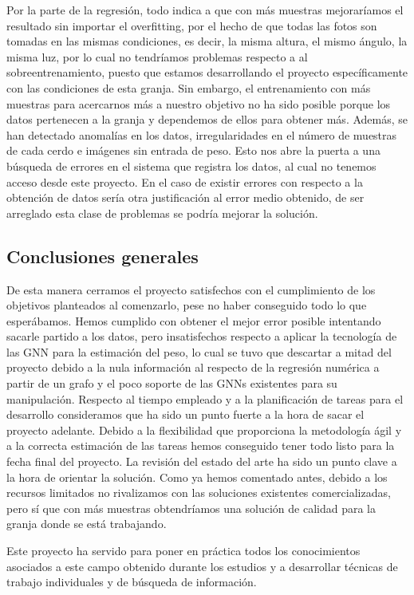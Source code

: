 ﻿\documentclass[10pt,a4paper,twocolumn,twoside]{article}
\begin{document}
Por la parte de la regresión, todo indica a que con más muestras mejoraríamos el resultado sin importar el overfitting, por el hecho de que todas las fotos son tomadas en las mismas condiciones, es decir, la misma altura, el mismo ángulo, la misma luz, por lo cual no tendríamos problemas respecto a al sobreentrenamiento, puesto que estamos desarrollando el proyecto específicamente con las condiciones de esta granja. Sin embargo, el entrenamiento con más muestras para acercarnos más a nuestro objetivo no ha sido posible porque los datos pertenecen a la granja y dependemos de ellos para obtener más.
Además, se han detectado anomalías en los datos, irregularidades en el número de muestras de cada cerdo e imágenes sin entrada de peso. Esto nos abre la puerta a una búsqueda de errores en el sistema que registra los datos, al cual no tenemos acceso desde este proyecto. En el caso de existir errores con respecto a la obtención de datos sería otra justificación al error medio obtenido, de ser arreglado esta clase de problemas se podría mejorar la solución.

\subsection{Conclusiones generales}
De esta manera cerramos el proyecto satisfechos con el cumplimiento de los objetivos planteados al comenzarlo, pese no haber conseguido todo lo que esperábamos. Hemos cumplido con obtener el mejor error posible intentando sacarle partido a los datos, pero insatisfechos respecto a aplicar la tecnología de las GNN para la estimación del peso, lo cual se tuvo que descartar a mitad del proyecto debido a la nula información al respecto de la regresión numérica a partir de un grafo y el poco soporte de las GNNs existentes para su manipulación.
Respecto al tiempo empleado y a la planificación de tareas para el desarrollo consideramos que ha sido un punto fuerte a la hora de sacar el proyecto adelante. Debido a la flexibilidad que proporciona la metodología ágil y a la correcta estimación de las tareas hemos conseguido tener todo listo para la fecha final del proyecto.
La revisión del estado del arte ha sido un punto clave a la hora de orientar la solución. Como ya hemos comentado antes, debido a los recursos limitados no rivalizamos con las soluciones existentes comercializadas, pero sí que con más muestras obtendríamos una solución de calidad para la granja donde se está trabajando.

Este proyecto ha servido para poner en práctica todos los conocimientos asociados a este campo obtenido durante los estudios y a desarrollar técnicas de trabajo individuales y de búsqueda de información.
\end{document}
